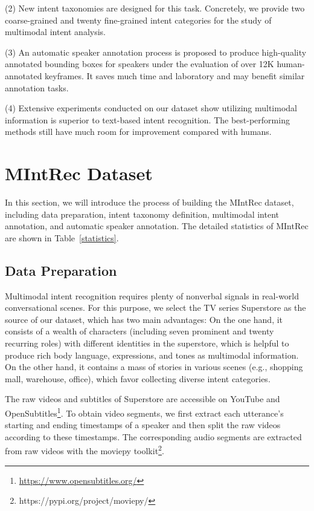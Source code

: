 \documentclass[sigconf,camera-ready]{acmart}
\begin{document}
(2) New intent taxonomies are designed for this task. Concretely, we provide two coarse-grained and twenty fine-grained intent categories for the study of multimodal intent analysis.

(3) An automatic speaker annotation process is proposed to produce high-quality annotated bounding boxes for speakers under the evaluation of over 12$\mathrm{K}$ human-annotated keyframes. It saves much time and laboratory and may benefit similar annotation tasks.

(4) Extensive experiments conducted on our dataset show utilizing multimodal information is superior to text-based intent recognition. The best-performing methods still have much room for improvement compared with humans. 

\section{MIntRec Dataset}
In this section, we will introduce the process of building the MIntRec dataset, including data preparation, intent taxonomy definition, multimodal intent annotation, and automatic speaker annotation. The detailed statistics of MIntRec are shown in Table~\ref{statistics}. 

\subsection{Data Preparation}
\label{data_collection}
Multimodal intent recognition requires plenty of nonverbal signals in real-world conversational scenes. For this purpose, we select the TV series Superstore as the source of our dataset, which has two main advantages: On the one hand, it consists of a wealth of characters (including seven prominent and twenty recurring roles) with different identities in the superstore, which is helpful to produce rich body language, expressions, and tones as multimodal information. On the other hand, it contains a mass of stories in various scenes (e.g., shopping mall, warehouse, office), which favor collecting diverse intent categories.

The raw videos and subtitles of Superstore are accessible on YouTube and OpenSubtitles\footnote{\url{https://www.opensubtitles.org/}}. To obtain video segments, we first extract each utterance's starting and ending timestamps of a speaker and then split the raw videos according to these timestamps. The corresponding audio segments are extracted from raw videos with the moviepy toolkit\footnote{https://pypi.org/project/moviepy/}. 
\end{document}
